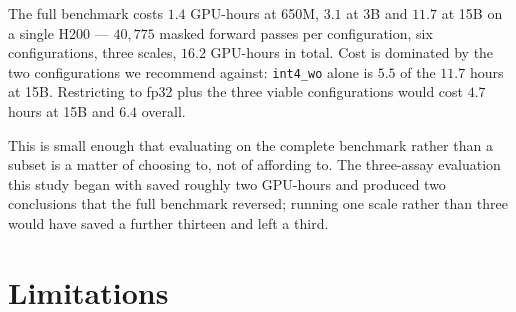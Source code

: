 \documentclass[11pt]{article}
\newcommand{\cfg}[1]{\texttt{#1}}
\begin{document}
The full benchmark costs $1.4$ GPU-hours at 650M, $3.1$ at 3B and $11.7$ at 15B
on a single H200 --- $40{,}775$ masked forward passes per configuration, six
configurations, three scales, $16.2$ GPU-hours in total. Cost is dominated by
the two configurations we recommend against: \cfg{int4\_wo} alone is $5.5$ of
the $11.7$ hours at 15B. Restricting to fp32 plus the three viable
configurations would cost $4.7$ hours at 15B and $6.4$ overall.

This is small enough that evaluating on the complete benchmark rather than a
subset is a matter of choosing to, not of affording to. The three-assay
evaluation this study began with saved roughly two GPU-hours and produced two
conclusions that the full benchmark reversed; running one scale rather than
three would have saved a further thirteen and left a third.

\section{Limitations}
\end{document}
